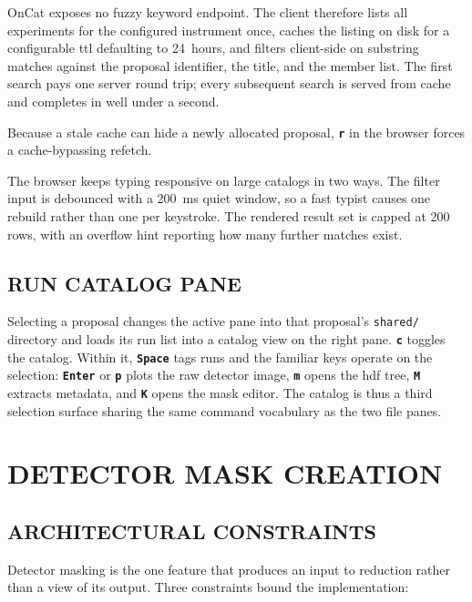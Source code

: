 \documentclass[tm]{ornltm}
\newcommand{\key}[1]{\textbf{\texttt{#1}}}
\begin{document}
OnCat exposes no fuzzy keyword endpoint. The client therefore lists all
experiments for the configured instrument once, caches the listing on disk for a
configurable \ac{ttl} defaulting to 24~hours, and filters client-side on
substring matches against the proposal identifier, the title, and the member
list. The first search pays one server round trip; every subsequent search is
served from cache and completes in well under a second.

Because a stale cache can hide a newly allocated proposal, \key{r} in the browser
forces a cache-bypassing refetch.

The browser keeps typing responsive on large catalogs in two ways. The filter
input is debounced with a 200~ms quiet window, so a fast typist causes one
rebuild rather than one per keystroke. The rendered result set is capped at 200
rows, with an overflow hint reporting how many further matches exist.

\subsection{RUN CATALOG PANE}

Selecting a proposal changes the active pane into that proposal's
\texttt{shared/} directory and loads its run list into a catalog view on the
right pane. \key{c} toggles the catalog. Within it, \key{Space} tags runs and the
familiar keys operate on the selection: \key{Enter} or \key{p} plots the raw
detector image, \key{m} opens the \ac{hdf} tree, \key{M} extracts metadata, and
\key{K} opens the mask editor. The catalog is thus a third selection surface
sharing the same command vocabulary as the two file panes.

\section{DETECTOR MASK CREATION}
\label{sec:mask}

\subsection{ARCHITECTURAL CONSTRAINTS}

Detector masking is the one feature that produces an input to reduction rather
than a view of its output. Three constraints bound the implementation:
\end{document}
